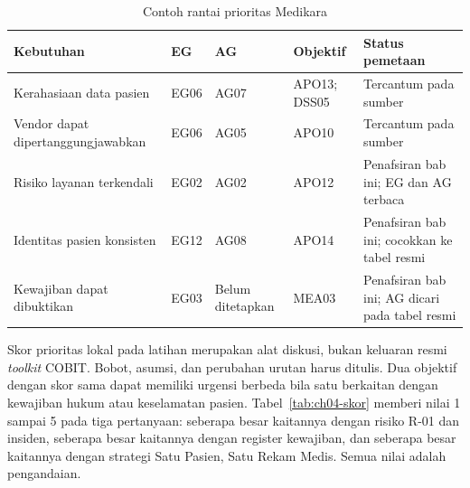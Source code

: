 \begin{table}[!htb]
  \centering\footnotesize
  \caption{Contoh rantai prioritas Medikara}\label{tab:ch04-cascade}
  \begin{tabularx}{\textwidth}{|>{\raggedright\arraybackslash}p{}|>{\raggedright\arraybackslash}p{}|>{\raggedright\arraybackslash}p{}|>{\raggedright\arraybackslash}p{}|>{\raggedright\arraybackslash}X|}
    \hline
    \textbf{Kebutuhan} & \textbf{EG} & \textbf{AG} & \textbf{Objektif} & \textbf{Status pemetaan} \\ \hline
    Kerahasiaan data pasien & EG06 & AG07 & APO13; DSS05 & Tercantum pada sumber \\ \hline
    Vendor dapat dipertanggungjawabkan & EG06 & AG05 & APO10 & Tercantum pada sumber \\ \hline
    Risiko layanan terkendali & EG02 & AG02 & APO12 & Penafsiran bab ini; EG dan AG terbaca \\ \hline
    Identitas pasien konsisten & EG12 & AG08 & APO14 & Penafsiran bab ini; cocokkan ke tabel resmi \\ \hline
    Kewajiban dapat dibuktikan & EG03 & Belum ditetapkan & MEA03 & Penafsiran bab ini; AG dicari pada tabel resmi \\ \hline
  \end{tabularx}
\end{table}

Skor prioritas lokal pada latihan merupakan alat diskusi, bukan keluaran resmi \textit{toolkit} COBIT. Bobot, asumsi, dan perubahan
urutan harus ditulis. Dua objektif dengan skor sama dapat memiliki urgensi berbeda bila satu berkaitan dengan kewajiban hukum atau
keselamatan pasien. Tabel~\ref{tab:ch04-skor} memberi nilai 1 sampai 5 pada tiga pertanyaan: seberapa besar kaitannya dengan risiko
R-01 dan insiden, seberapa besar kaitannya dengan register kewajiban, dan seberapa besar kaitannya dengan strategi Satu Pasien, Satu
Rekam Medis. Semua nilai adalah pengandaian.

